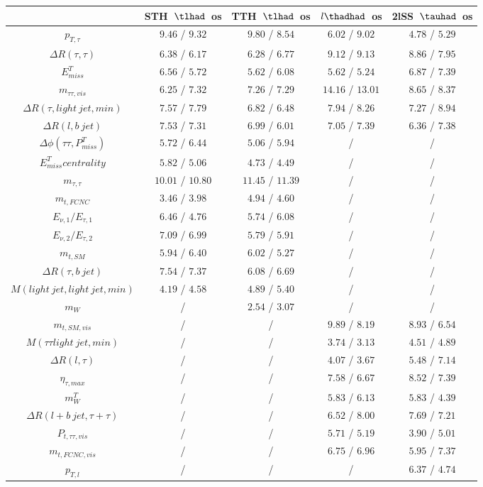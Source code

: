 \centering
\begin{tabular}{|c|c|c|c|c|} \hline
 & STH~$\tlhad$~os & TTH~$\tlhad$~os & $l\thadhad$~os & 2lSS~$\tauhad$~os\\\hline
$p_{T,\tau }$ & $9.46$ / $9.32$ & $9.80$ / $8.54$ & $6.02$ / $9.02$ & $4.78$ / $5.29$\\\hline
$\Delta R(\tau ,\tau )$ & $6.38$ / $6.17$ & $6.28$ / $6.77$ & $9.12$ / $9.13$ & $8.86$ / $7.95$\\\hline
$E^{T}_{miss}$ & $6.56$ / $5.72$ & $5.62$ / $6.08$ & $5.62$ / $5.24$ & $6.87$ / $7.39$\\\hline
$m_{\tau \tau ,vis}$ & $6.25$ / $7.32$ & $7.26$ / $7.29$ & $14.16$ / $13.01$ & $8.65$ / $8.37$\\\hline
$\Delta R(\tau ,light~jet,min)$ & $7.57$ / $7.79$ & $6.82$ / $6.48$ & $7.94$ / $8.26$ & $7.27$ / $8.94$\\\hline
$\Delta R(l,b~jet)$ & $7.53$ / $7.31$ & $6.99$ / $6.01$ & $7.05$ / $7.39$ & $6.36$ / $7.38$\\\hline
$\Delta\phi(\tau \tau ,P^{T}_{miss})$ & $5.72$ / $6.44$ & $5.06$ / $5.94$ &  / &  /\\\hline
$E^{T}_{miss} centrality$ & $5.82$ / $5.06$ & $4.73$ / $4.49$ &  / &  /\\\hline
$m_{\tau ,\tau }$ & $10.01$ / $10.80$ & $11.45$ / $11.39$ &  / &  /\\\hline
$m_{t,FCNC}$ & $3.46$ / $3.98$ & $4.94$ / $4.60$ &  / &  /\\\hline
$E_{\nu,1}/E_{\tau ,1}$ & $6.46$ / $4.76$ & $5.74$ / $6.08$ &  / &  /\\\hline
$E_{\nu,2}/E_{\tau ,2}$ & $7.09$ / $6.99$ & $5.79$ / $5.91$ &  / &  /\\\hline
$m_{t,SM}$ & $5.94$ / $6.40$ & $6.02$ / $5.27$ &  / &  /\\\hline
$\Delta R(\tau ,b~jet)$ & $7.54$ / $7.37$ & $6.08$ / $6.69$ &  / &  /\\\hline
$M(light~jet,light~jet,min)$ & $4.19$ / $4.58$ & $4.89$ / $5.40$ &  / &  /\\\hline
$m_{W}$ &  / & $2.54$ / $3.07$ &  / &  /\\\hline
$m_{t,SM,vis}$ &  / &  / & $9.89$ / $8.19$ & $8.93$ / $6.54$\\\hline
$M(\tau \tau light~jet,min)$ &  / &  / & $3.74$ / $3.13$ & $4.51$ / $4.89$\\\hline
$\Delta R(l,\tau )$ &  / &  / & $4.07$ / $3.67$ & $5.48$ / $7.14$\\\hline
$\eta_{\tau ,max}$ &  / &  / & $7.58$ / $6.67$ & $8.52$ / $7.39$\\\hline
$m^{T}_{W}$ &  / &  / & $5.83$ / $6.13$ & $5.83$ / $4.39$\\\hline
$\Delta R(l+b~jet,\tau +\tau )$ &  / &  / & $6.52$ / $8.00$ & $7.69$ / $7.21$\\\hline
$P_{t,\tau \tau ,vis}$ &  / &  / & $5.71$ / $5.19$ & $3.90$ / $5.01$\\\hline
$m_{t,FCNC,vis}$ &  / &  / & $6.75$ / $6.96$ & $5.95$ / $7.37$\\\hline
$p_{T,l}$ &  / &  / &  / & $6.37$ / $4.74$\\\hline
\end{tabular}
